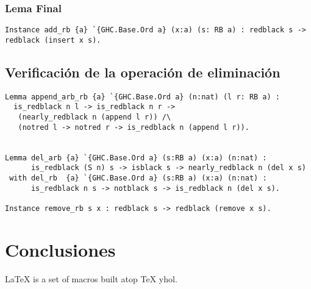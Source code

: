 \documentclass[letterpaper,12pt,oneside]{book}
\theoremstyle{plain}
\theoremstyle{definition}
\theoremstyle{remark}
\begin{document}
\subsection{Lema Final}
\begin{verbatim}
Instance add_rb {a} `{GHC.Base.Ord a} (x:a) (s: RB a) : redblack s -> redblack (insert x s).
\end{verbatim}
\section{Verificación de la operación de eliminación}
\begin{verbatim}
Lemma append_arb_rb {a} `{GHC.Base.Ord a} (n:nat) (l r: RB a) : 
  is_redblack n l -> is_redblack n r ->
   (nearly_redblack n (append l r)) /\
   (notred l -> notred r -> is_redblack n (append l r)).


Lemma del_arb {a} `{GHC.Base.Ord a} (s:RB a) (x:a) (n:nat) :
      is_redblack (S n) s -> isblack s -> nearly_redblack n (del x s)
 with del_rb  {a} `{GHC.Base.Ord a} (s:RB a) (x:a) (n:nat) :
      is_redblack n s -> notblack s -> is_redblack n (del x s).

Instance remove_rb s x : redblack s -> redblack (remove x s).
\end{verbatim}
\chapter{Conclusiones}  
\LaTeX{} \cite{latex2e} is a set of macros built atop \TeX{} \cite{texbook} yhol\cite{latex:companion}.
\backmatter%
\end{document}
